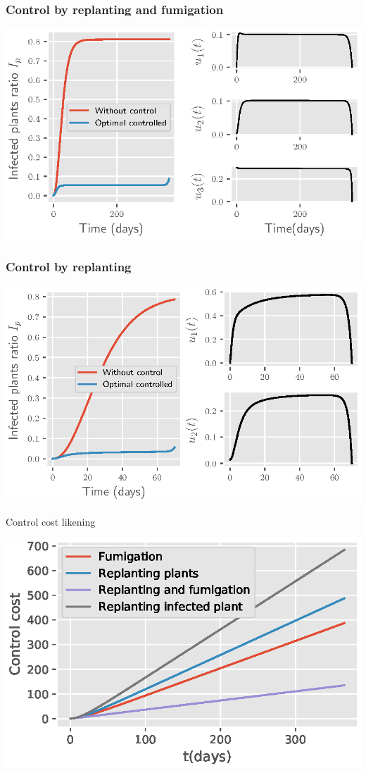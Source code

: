 \begin{frame}
    \frametitle{Control by replanting and fumigation}
    \begin{center}
        \includegraphics{numerical_results/figure_1_tomato_replanting_and_fumigation}
    \end{center}
    
\end{frame}
\begin{frame}
    \frametitle{Control by replanting}
    \begin{center}
        \includegraphics{numerical_results/figure_1_tomato_control_replanting}
    \end{center}
\end{frame}
\begin{frame}{Control cost likening}
    \begin{center}
        \includegraphics{numerical_results/control_cost}
    \end{center}
\end{frame}
